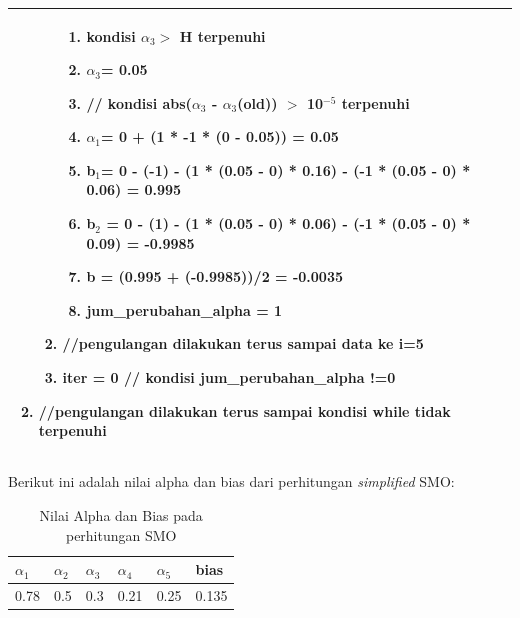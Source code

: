 \begin{table}[H]
\begin{adjustbox}{width=1\textwidth}
\begin{tabular}{|p{13.55cm}|}
\begin{enumerate}[label={},leftmargin=*,noitemsep]
\begin{enumerate}[label={},noitemsep]
\begin{enumerate}[label={},noitemsep]
					\item kondisi $\alpha_{3}>$ H terpenuhi
					\item $\alpha_{3}$= 0.05
					\item // kondisi abs($\alpha_{3}$ - $\alpha_{3}$(old)) $>$ 10$^{-5}$ terpenuhi
					\item $\alpha_{ 1 }$= 0 + (1 * -1 * (0 - 0.05)) = 0.05
					\item b$_{1 }$= 0 - (-1) - (1 * (0.05 - 0) * 0.16) - 
					(-1 * (0.05 - 0) * 0.06) = 0.995
					\item b$_{2}$ = 0 - (1) - (1 * (0.05 - 0) * 
					0.06) - (-1 * (0.05 - 0) * 0.09) = -0.9985
					\item b = (0.995 + (-0.9985))/2 = -0.0035
					\item jum\_perubahan\_alpha = 1
								
				\end{enumerate}
				\item //pengulangan dilakukan terus sampai data ke i=5
				\item iter = 0 // kondisi jum\_perubahan\_alpha !=0	
			\end{enumerate}
			\item //pengulangan dilakukan terus sampai kondisi while tidak terpenuhi 	
		\end{enumerate}
		\\
		\hline
	\end{tabular}
	\end{adjustbox}
\end{table}
\noindent Berikut ini adalah nilai alpha dan bias dari perhitungan \textit{simplified} SMO:

\begin{table}[H]
	\caption{Nilai Alpha dan Bias pada perhitungan SMO}
	\centering
	\small
	\begin{adjustbox}{width=1\textwidth}
	\begin{tabular}{|p{1.87cm}|p{1.87cm}|p{1.87cm}|p{1.87cm}|p{1.87cm}|p{2cm}|}
		\hline
		$\alpha_{1}$ & $\alpha_{2}$ & $\alpha_{3}$ & $\alpha_{4}$ & $\alpha_{5}$ & bias\\
		\hline
		0.78 & 0.5 & 0.3 & 0.21 & 0.25 & 0.135 \\
		\hline
	\end{tabular}
	\end{adjustbox}
\end{table}

